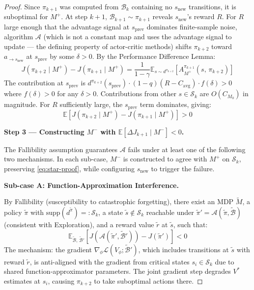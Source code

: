\documentclass{article}
\begin{document}
\begin{proof}
Since $\pi_{k+1}$ was computed from $\mathcal{B}_k$ containing no $s_{\text{new}}$ transitions, it is suboptimal for $M^+$. At step $k+1$, $\mathcal{B}_{k+1} \sim \pi_{k+1}$ reveals $s_{\text{new}}$'s reward $R$. For $R$ large enough that the advantage signal at $s_{\text{prev}}$ dominates finite-sample noise, algorithm $\mathcal{A}$ (which is not a constant map and uses the advantage signal to update — the defining property of actor-critic methods) shifts $\pi_{k+2}$ toward $a_{\to s_{\text{new}}}$ at $s_{\text{prev}}$ by some $\delta > 0$. By the Performance Difference Lemma:
\[
J(\pi_{k+2} \mid M^+) - J(\pi_{k+1} \mid M^+) = \frac{1}{1-\gamma} \mathbb{E}_{s \sim d^{\pi_{k+2}}}\!\left[A^{\pi_{k+1}}_{M^+}(s,\, \pi_{k+2})\right]
\]
The contribution at $s_{\text{prev}}$ is $d^{\pi_{k+2}}(s_{\text{prev}}) \cdot (1-q)(R - C_{\text{avg}}) \cdot f(\delta) > 0$ where $f(\delta) > 0$ for any $\delta > 0$. Contributions from other $s \in \mathcal{S}_k$ are $O(C_{M_0})$ in magnitude. For $R$ sufficiently large, the $s_{\text{prev}}$ term dominates, giving:
\[
\mathbb{E}\!\left[J(\pi_{k+2} \mid M^+) - J(\pi_{k+1} \mid M^+)\right] > 0
\]

\textbf{Step 3 — Constructing $M^-$ with $\mathbb{E}[\Delta J_{k+1} \mid M^-] < 0$.}

The Fallibility assumption guarantees $\mathcal{A}$ fails under at least one of the following two mechanisms. In each sub-case, $M^-$ is constructed to agree with $M^+$ on $\mathcal{S}_k$, preserving \eqref{eq:star-proof}, while configuring $s_{\text{new}}$ to trigger the failure.

\textbf{Sub-case A: Function-Approximation Interference.}

By Fallibility (susceptibility to catastrophic forgetting), there exist an MDP $\widetilde{M}$, a policy $\tilde{\pi}$ with $\text{supp}(d^{\tilde{\pi}}) =: \mathcal{S}_k$, a state $\tilde{s} \notin \mathcal{S}_k$ reachable under $\tilde{\pi}' = \mathcal{A}(\tilde{\pi}, \widetilde{\mathcal{B}})$ (consistent with Exploration), and a reward value $\tilde{r}$ at $\tilde{s}$, such that:
\[
\mathbb{E}_{\widetilde{\mathcal{B}},\, \widetilde{\mathcal{B}}'}\!\left[J\!\left(\mathcal{A}(\tilde{\pi}', \widetilde{\mathcal{B}}')\right) - J(\tilde{\pi}')\right] < 0
\]
The mechanism: the gradient $\nabla_\phi \mathcal{L}(V_\phi; \widetilde{\mathcal{B}}')$, which includes transitions at $\tilde{s}$ with reward $\tilde{r}$, is anti-aligned with the gradient from critical states $s_i \in \mathcal{S}_k$ due to shared function-approximator parameters. The joint gradient step degrades $V^*$ estimates at $s_i$, causing $\pi_{k+2}$ to take suboptimal actions there.


\end{proof}
\end{document}
